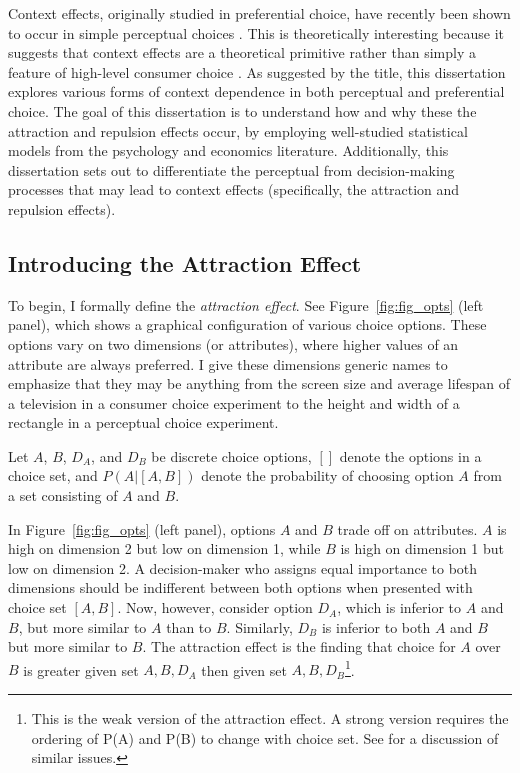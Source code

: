 Context effects, originally studied in preferential choice, have recently been shown to occur in simple perceptual choices \parencite{trueblood2013not,spektorWhenGoodLooks2018b,liaoInfluenceDistanceDecoy2021,spektorRepulsionEffectPreferential2022,evansImpactPresentationOrder2021}. This is theoretically interesting because it suggests that context effects are a theoretical primitive rather than simply a feature of high-level consumer choice \parencite{trueblood2013not}. As suggested by the title, this dissertation explores various forms of context dependence in both perceptual and preferential choice. The goal of this dissertation is to understand how and why these the attraction and repulsion effects occur, by employing well-studied statistical models from the psychology and economics literature. Additionally, this dissertation sets out to differentiate the perceptual from decision-making processes that may lead to context effects (specifically, the attraction and repulsion effects).

\subsection{Introducing the Attraction Effect}

To begin, I formally define the \textit{attraction effect}. See Figure~\ref{fig:fig_opts} (left panel), which shows a graphical configuration of various choice options. These options vary on two dimensions (or attributes), where higher values of an attribute are always preferred. I give these dimensions generic names to emphasize that they may be anything from the screen size and average lifespan of a television in a consumer choice experiment to the height and width of a rectangle in a perceptual choice experiment.

Let $A$, $B$, $D_{A}$, and $D_{B}$ be discrete choice options, $[]$ denote the options in a choice set, and $P(A|[A,B])$ denote the probability of choosing option $A$ from a set consisting of $A$ and $B$. 

In Figure~\ref{fig:fig_opts} (left panel), options $A$ and $B$ trade off on attributes. $A$ is high on dimension 2 but low on dimension 1, while $B$ is high on dimension 1 but low on dimension 2. A decision-maker who assigns equal importance to both dimensions should be indifferent between both options when presented with choice set $[A,B]$. Now, however, consider option $D_{A}$, which is inferior to $A$ and $B$, but more similar to $A$ than to $B$. Similarly, $D_{B}$ is inferior to both $A$ and $B$ but more similar to $B$. The attraction effect is the finding that choice for $A$ over $B$ is greater given set ${A,B,D_{A}}$ then given set $A,B,D_{B}$\footnote{This is the weak version of the attraction effect. A strong version requires the ordering of P(A) and P(B) to change with choice set. See \textcite{davis2023illustrated} for a discussion of similar issues.}. 

